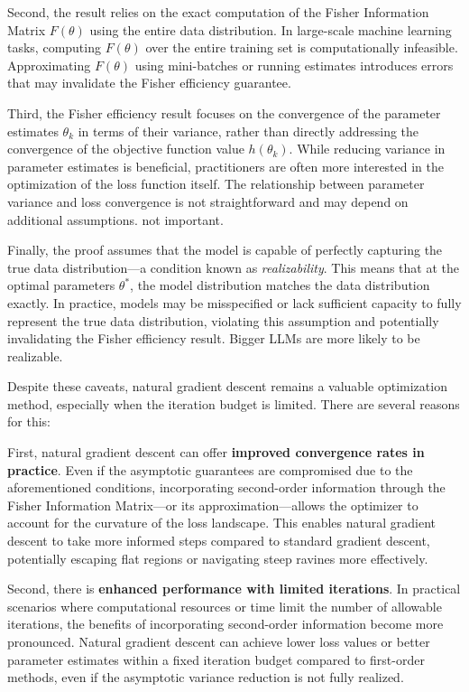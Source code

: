 Second, the result relies on the exact computation of the Fisher Information Matrix \( F(\theta) \) using the entire data distribution. In large-scale machine learning tasks, computing \( F(\theta) \) over the entire training set is computationally infeasible. Approximating \( F(\theta) \) using mini-batches or running estimates introduces errors that may invalidate the Fisher efficiency guarantee.

Third, the Fisher efficiency result focuses on the convergence of the parameter estimates \( \theta_k \) in terms of their variance, rather than directly addressing the convergence of the objective function value \( h(\theta_k) \). While reducing variance in parameter estimates is beneficial, practitioners are often more interested in the optimization of the loss function itself. The relationship between parameter variance and loss convergence is not straightforward and may depend on additional assumptions. not important.

Finally, the proof assumes that the model is capable of perfectly capturing the true data distribution—a condition known as \emph{realizability}. This means that at the optimal parameters \( \theta^* \), the model distribution matches the data distribution exactly. In practice, models may be misspecified or lack sufficient capacity to fully represent the true data distribution, violating this assumption and potentially invalidating the Fisher efficiency result. Bigger LLMs are more likely to be realizable.

Despite these caveats, natural gradient descent remains a valuable optimization method, especially when the iteration budget is limited. There are several reasons for this:

First, natural gradient descent can offer \textbf{improved convergence rates in practice}. Even if the asymptotic guarantees are compromised due to the aforementioned conditions, incorporating second-order information through the Fisher Information Matrix—or its approximation—allows the optimizer to account for the curvature of the loss landscape. This enables natural gradient descent to take more informed steps compared to standard gradient descent, potentially escaping flat regions or navigating steep ravines more effectively.

Second, there is \textbf{enhanced performance with limited iterations}. In practical scenarios where computational resources or time limit the number of allowable iterations, the benefits of incorporating second-order information become more pronounced. Natural gradient descent can achieve lower loss values or better parameter estimates within a fixed iteration budget compared to first-order methods, even if the asymptotic variance reduction is not fully realized.

